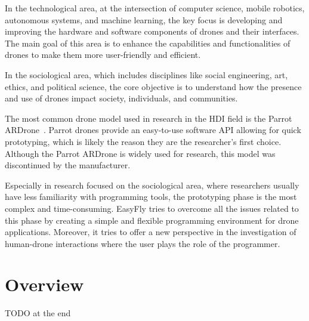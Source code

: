 In the technological area, at the intersection of computer science, mobile robotics, autonomous systems, and machine learning,
the key focus is developing and improving the hardware and software components of drones and their interfaces.
The main goal of this area is to enhance the capabilities and functionalities of drones to make them more user-friendly and efficient.

In the sociological area, which includes disciplines like social engineering, art, ethics, and political science,
the core objective is to understand how the presence and use of drones impact society, individuals, and communities.

The most common drone model used in research in the HDI field is the Parrot ARDrone~\cite{tezza2019hdi}. 
Parrot drones provide an easy-to-use software API allowing for quick prototyping, which is likely the reason they are the
researcher's first choice. Although the Parrot ARDrone is widely used for research, this model was discontinued by the manufacturer.

Especially in research focused on the sociological area, where researchers usually have less familiarity with programming tools, 
the prototyping phase is the most complex and time-consuming. 
EasyFly tries to overcome all the issues related to this phase by creating a simple and flexible programming environment for drone applications.
Moreover, it tries to offer a new perspective in the investigation of human-drone interactions where the user plays the role of the programmer.

\section{Overview}\label{sec:intro_overview}

TODO at the end